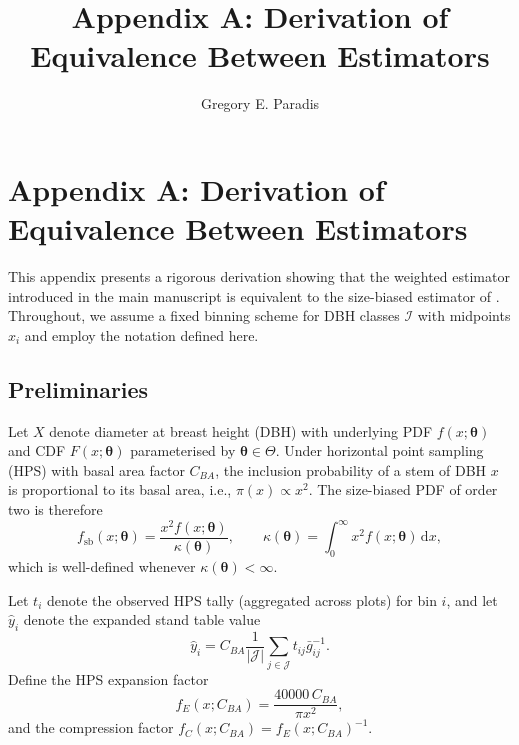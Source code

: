 \documentclass[12pt,letterpaper]{article}
\title{Appendix A: Derivation of Equivalence Between Estimators}
\author{Gregory E. Paradis}
\date{}
\theoremstyle{plain}
\begin{document}
\doublespacing
\maketitle
\linenumbers

\section*{Appendix A: Derivation of Equivalence Between Estimators}

This appendix presents a rigorous derivation showing that the weighted estimator introduced
in the main manuscript is equivalent to the size-biased estimator of
\citet{van1986, ducey2015}. Throughout, we assume a fixed binning scheme for
DBH classes $\mathcal{I}$ with midpoints $x_i$ and employ the notation defined
here.

\setcounter{equation}{0}
\renewcommand{\theequation}{A\arabic{equation}}
\setcounter{figure}{0}
\renewcommand{\thefigure}{A\arabic{figure}}
\setcounter{table}{0}
\renewcommand{\thetable}{A\arabic{table}}

\subsection*{Preliminaries}

Let $X$ denote diameter at breast height (DBH) with underlying PDF
$f(x;\boldsymbol{\theta})$ and CDF $F(x;\boldsymbol{\theta})$ parameterised by
$\boldsymbol{\theta}\in\Theta$. Under horizontal point sampling (HPS) with basal
area factor $C_{BA}$, the inclusion probability of a stem of DBH $x$ is
proportional to its basal area, i.e., $\pi(x)\propto x^2$. The size-biased PDF
of order two is therefore
\begin{equation}
  f_{\mathrm{sb}}(x;\boldsymbol{\theta})
  =
  \frac{x^{2} f(x;\boldsymbol{\theta})}{\kappa(\boldsymbol{\theta})},
  \qquad
  \kappa(\boldsymbol{\theta})
  =
  \int_{0}^{\infty} x^{2} f(x;\boldsymbol{\theta})\,\mathrm{d}x,
\end{equation}
which is well-defined whenever $\kappa(\boldsymbol{\theta}) < \infty$.

Let $t_i$ denote the observed HPS tally (aggregated across plots) for bin $i$,
and let $\hat{y}_i$ denote the expanded stand table value
\begin{equation}
  \hat{y}_i = C_{BA} \frac{1}{|\mathcal{J}|} \sum_{j \in \mathcal{J}} t_{ij} \bar{g}_{ij}^{-1}.
\end{equation}
Define the HPS expansion factor
\begin{equation}
  f_E(x; C_{BA}) = \frac{40000 \, C_{BA}}{\pi x^2},
\end{equation}
and the compression factor $f_C(x; C_{BA}) = f_E(x; C_{BA})^{-1}$.
\end{document}
